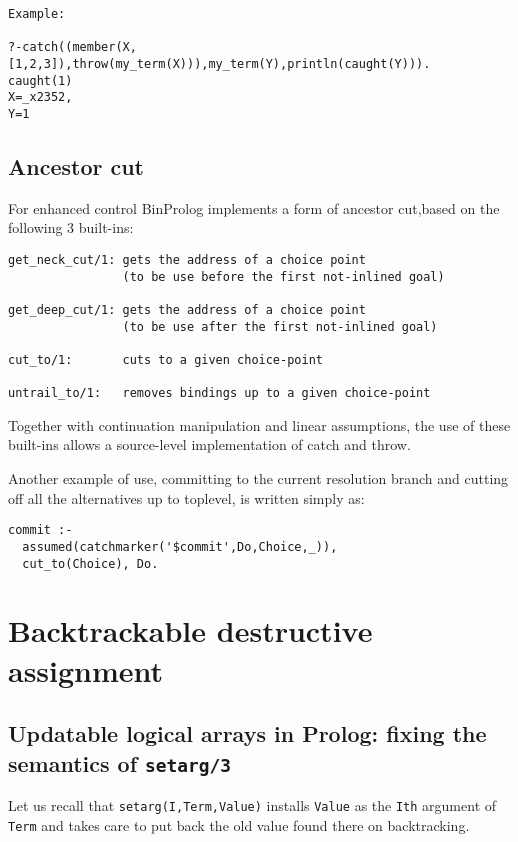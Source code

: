 \documentclass{article}
\begin{document}
{\small
\begin{verbatim}
Example:

?-catch((member(X,[1,2,3]),throw(my_term(X))),my_term(Y),println(caught(Y))).
caught(1)
X=_x2352,
Y=1
\end{verbatim}
}

\subsection{Ancestor cut}

For enhanced control
BinProlog  implements a form of ancestor cut,based on the following
3 built-ins:
{\small
\begin{verbatim}
get_neck_cut/1: gets the address of a choice point 
                (to be use before the first not-inlined goal)

get_deep_cut/1: gets the address of a choice point 
                (to be use after the first not-inlined goal)

cut_to/1:       cuts to a given choice-point

untrail_to/1:   removes bindings up to a given choice-point
\end{verbatim}
}

Together with continuation manipulation and linear assumptions, the use of these built-ins allows a source-level implementation of catch and throw.

Another example of use, committing to the current resolution branch and cutting off
all the alternatives up to toplevel, is written simply as:

{\small
\begin{verbatim}
commit :-
  assumed(catchmarker('$commit',Do,Choice,_)),
  cut_to(Choice), Do.
\end{verbatim}
}

\section{Backtrackable destructive assignment}

\subsection{Updatable logical arrays in Prolog: fixing the semantics of {\tt setarg/3}}

Let us recall that {\tt setarg(I,Term,Value)}  installs
{\tt Value} as the {\tt I\-th} argument of {\tt Term} and takes care to
put back the old value found there on backtracking.
\end{document}
